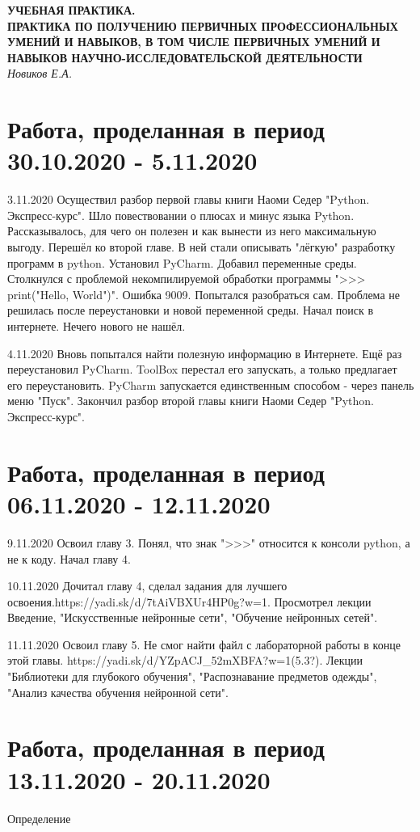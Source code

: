 \documentclass[12pt,a4paper]{report}
\begin{document}
	\begin{center}
		{\large\bf УЧЕБНАЯ ПРАКТИКА.\\
			ПРАКТИКА ПО ПОЛУЧЕНИЮ ПЕРВИЧНЫХ  ПРОФЕССИОНАЛЬНЫХ УМЕНИЙ И НАВЫКОВ, В ТОМ ЧИСЛЕ ПЕРВИЧНЫХ УМЕНИЙ И НАВЫКОВ НАУЧНО-ИССЛЕДОВАТЕЛЬСКОЙ ДЕЯТЕЛЬНОСТИ}\\
		{\it Новиков Е.А.}
	\end{center}
	
	\newpage
	
	\section{Работа, проделанная в период 30.10.2020 - 5.11.2020}
	3.11.2020 Осуществил разбор первой главы книги Наоми Седер "Python. Экспресс-курс". Шло повествовании о плюсах и минус языка Python. Рассказывалось, для чего он полезен и как вынести из него максимальную выгоду. Перешёл ко второй главе. В ней стали описывать "лёгкую" разработку программ в python. Установил PyCharm. Добавил переменные среды. Столкнулся с проблемой некомпилируемой обработки программы ">>> print("Hello, World")". Ошибка 9009. Попытался разобраться сам. Проблема не решилась после переустановки и новой переменной среды. Начал поиск в интернете. Нечего нового не нашёл.

	4.11.2020 Вновь попытался найти полезную информацию в Интернете. Ещё раз переустановил PyCharm. ToolBox перестал его запускать, а только предлагает его переустановить. PyCharm запускается единственным способом - через панель меню "Пуск". Закончил разбор второй главы книги Наоми Седер "Python. Экспресс-курс".
	
	\section{Работа, проделанная в период 06.11.2020 - 12.11.2020}
	9.11.2020 Освоил главу 3. Понял, что знак ">>>" относится к консоли python, а не к коду. Начал главу 4.

	10.11.2020 Дочитал главу 4, сделал задания для лучшего освоения.https://yadi.sk/d/7tAiVBXUr4HP0g?w=1. Просмотрел лекции Введение, "Искусственные нейронные сети", "Обучение нейронных сетей".

	11.11.2020 Освоил главу 5. Не смог найти файл с лабораторной работы в конце этой главы. https://yadi.sk/d/YZpACJ_52mXBFA?w=1(5.3?). Лекции "Библиотеки для глубокого обучения", "Распознавание предметов одежды", "Анализ качества обучения нейронной сети".
	
	\section{Работа, проделанная в период 13.11.2020 - 20.11.2020}
	Определение 
\end{document}
